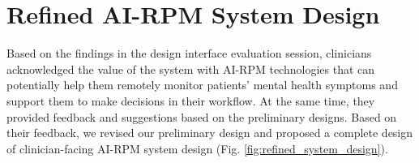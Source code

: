 \section{Refined AI-RPM System Design}
Based on the findings in the design interface evaluation session, clinicians acknowledged the value of the system with AI-RPM technologies that can potentially help them remotely monitor patients' mental health symptoms and support them to make decisions in their workflow. At the same time, they provided feedback and suggestions based on the preliminary designs. Based on their feedback, we revised our preliminary design and proposed a complete design of clinician-facing AI-RPM system design (Fig. \ref{fig:refined_system_design}).



